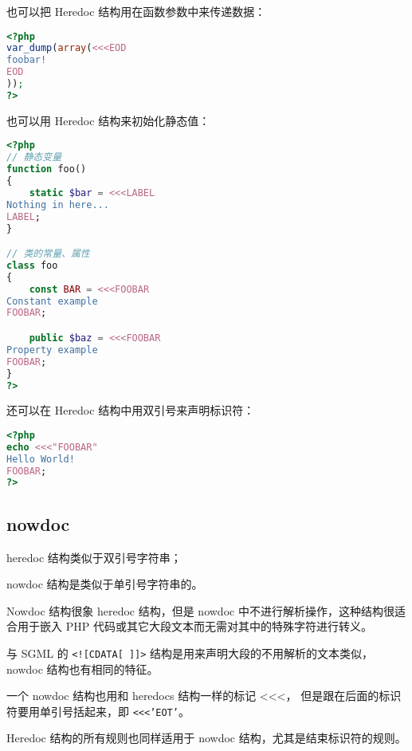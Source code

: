 \begin{compactitem}
\item 也可以把 Heredoc 结构用在函数参数中来传递数据：

\begin{lstlisting}[language=PHP]
<?php
var_dump(array(<<<EOD
foobar!
EOD
));
?>
\end{lstlisting}

\item 也可以用 Heredoc 结构来初始化静态值：

\begin{lstlisting}[language=PHP]
<?php
// 静态变量
function foo()
{
    static $bar = <<<LABEL
Nothing in here...
LABEL;
}

// 类的常量、属性
class foo
{
    const BAR = <<<FOOBAR
Constant example
FOOBAR;

    public $baz = <<<FOOBAR
Property example
FOOBAR;
}
?>
\end{lstlisting}

\item 还可以在 Heredoc 结构中用双引号来声明标识符：

\begin{lstlisting}[language=PHP]
<?php
echo <<<"FOOBAR"
Hello World!
FOOBAR;
?>
\end{lstlisting}

\end{compactitem}



\subsection{nowdoc}


\begin{compactitem}
\item heredoc 结构类似于双引号字符串；
\item nowdoc 结构是类似于单引号字符串的。
\end{compactitem}


Nowdoc 结构很象 heredoc 结构，但是 nowdoc 中不进行解析操作，这种结构很适合用于嵌入 PHP 代码或其它大段文本而无需对其中的特殊字符进行转义。

与 SGML 的 \texttt{<![CDATA[ ]]>} 结构是用来声明大段的不用解析的文本类似，nowdoc 结构也有相同的特征。

一个 nowdoc 结构也用和 heredocs 结构一样的标记 <\/<\/<， 但是跟在后面的标识符要用单引号括起来，即 \texttt{<\/<\/<'EOT'}。

Heredoc 结构的所有规则也同样适用于 nowdoc 结构，尤其是结束标识符的规则。

